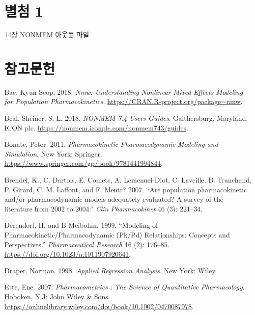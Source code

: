 \documentclass[
  10pt,
  krantz2,
  a4paper]{krantz}
\newlength{\cslhangindent}
\newenvironment{cslreferences}%
  {\setlength{\parindent}{0pt}%
  \everypar{\setlength{\hangindent}{\cslhangindent}}\ignorespaces}%
  {\par}
\theoremstyle{definition}
\theoremstyle{definition}
\theoremstyle{definition}
\theoremstyle{remark}
\begin{document}
\hypertarget{appendix-uxbcc4uxcca8}{%
\appendix {}}


\hypertarget{uxbcc4uxcca8-1}{%
\chapter{별첨 1}\label{uxbcc4uxcca8-1}}

14장 NONMEM 아웃풋 파일

\hypertarget{uxcc38uxace0uxbb38uxd5cc}{%
\chapter*{참고문헌}\label{uxcc38uxace0uxbb38uxd5cc}}


\hypertarget{refs}{}
\begin{cslreferences}
\leavevmode\hypertarget{ref-R-nmw}{}%
Bae, Kyun-Seop. 2018. \emph{Nmw: Understanding Nonlinear Mixed Effects Modeling for Population Pharmacokinetics}. \url{https://CRAN.R-project.org/package=nmw}.

\leavevmode\hypertarget{ref-nonmem}{}%
Beal, Sheiner, S. L. 2018. \emph{NONMEM 7.4 Users Guides}. Gaithersburg, Maryland: ICON plc. \url{https://nonmem.iconplc.com/nonmem743/guides}.

\leavevmode\hypertarget{ref-bonate}{}%
Bonate, Peter. 2011. \emph{Pharmacokinetic-Pharmacodynamic Modeling and Simulation}. New York: Springer. \url{https://www.springer.com/gp/book/9781441994844}.

\leavevmode\hypertarget{ref-pmid17328581}{}%
Brendel, K., C. Dartois, E. Comets, A. Lemenuel-Diot, C. Laveille, B. Tranchand, P. Girard, C. M. Laffont, and F. Mentr? 2007. ``Are population pharmacokinetic and/or pharmacodynamic models adequately evaluated? A survey of the literature from 2002 to 2004.'' \emph{Clin Pharmacokinet} 46 (3): 221--34.

\leavevmode\hypertarget{ref-derendorf1999modeling}{}%
Derendorf, H, and B Meibohm. 1999. ``Modeling of Pharmacokinetic/Pharmacodynamic (Pk/Pd) Relationships: Concepts and Perspectives.'' \emph{Pharmaceutical Research} 16 (2): 176--85. \url{https://doi.org/10.1023/a:1011907920641}.

\leavevmode\hypertarget{ref-draper1998applied}{}%
Draper, Norman. 1998. \emph{Applied Regression Analysis}. New York: Wiley.

\leavevmode\hypertarget{ref-ette}{}%
Ette, Ene. 2007. \emph{Pharmacometrics : The Science of Quantitative Pharmacology}. Hoboken, N.J: John Wiley \& Sons. \url{https://onlinelibrary.wiley.com/doi/book/10.1002/0470087978}.


\end{cslreferences}
\end{document}
